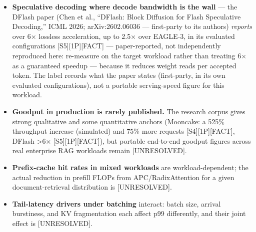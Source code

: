 \begin{itemize}
  independent measurement) cuts TTFT by 2--22× in one
  warm-cache-hit/reuse benchmark: a single-request TTFT micro-benchmark
  on Llama-3.1-8B-Instruct at H100, in which the post states that the
  range depends on prompt size. That is a TTFT metric for cache-hit
  requests, not a generic cold-cache improvement --- both are
  memory-layer fixes the telemetry would call for when KV occupancy
  nears capacity.
\item
  \textbf{Speculative decoding where decode bandwidth is the wall} ---
  the DFlash paper (Chen et al., ``DFlash: Block Diffusion for Flash
  Speculative Decoding,'' ICML 2026; arXiv:2602.06036 --- first-party to
  its authors) \emph{reports} over 6× lossless acceleration, up to 2.5×
  over EAGLE-3, in its evaluated configurations
  \mbox{{[}S5{]}}\hspace{0pt}\mbox{{[}1P{]}}\hspace{0pt}\mbox{{[}FACT{]}} --- paper-reported, not independently
  reproduced here: re-measure on the target workload rather than
  treating 6× as a guaranteed speedup --- because it reduces weight
  reads per accepted token. The label records what the paper states
  (first-party, in its own evaluated configurations), not a portable
  serving-speed figure for this workload.
\end{itemize}

\label{what-we-still-dont-know}


\begin{itemize}
\tightlist
\item
  \textbf{Goodput in production is rarely published.} The research
  corpus gives strong qualitative and some quantitative anchors
  (Mooncake: a 525\% throughput increase (simulated) and 75\% more
  requests \mbox{{[}S4{]}}\hspace{0pt}\mbox{{[}1P{]}}\hspace{0pt}\mbox{{[}FACT{]}}, DFlash \textgreater6×
  \mbox{{[}S5{]}}\hspace{0pt}\mbox{{[}1P{]}}\hspace{0pt}\mbox{{[}FACT{]}}), but portable end-to-end goodput figures
  across real enterprise RAG workloads remain \mbox{{[}UNRESOLVED{]}}.
\item
  \textbf{Prefix-cache hit rates in mixed workloads} are
  workload-dependent; the actual reduction in prefill FLOPs from
  APC/RadixAttention for a given document-retrieval distribution is
  \mbox{{[}UNRESOLVED{]}}.
\item
  \textbf{Tail-latency drivers under batching} interact: batch size,
  arrival burstiness, and KV fragmentation each affect p99 differently,
  and their joint effect is \mbox{{[}UNRESOLVED{]}}.
\end{itemize}

